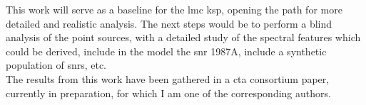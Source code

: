 \documentclass[main.tex]{subfiles}
\begin{document}
This work will serve as a baseline for the \gls{lmc} \gls{ksp}, opening the path for more detailed and realistic analysis. The next steps would be to perform a blind analysis of the point sources, with a detailed study of the spectral features which could be derived, include in the model the \gls{snr} 1987A, include a synthetic population of \glspl{snr}, etc.\\
The results from this work have been gathered in a \gls{cta} consortium paper, currently in preparation, for which I am one of the corresponding authors. 
\end{document}
